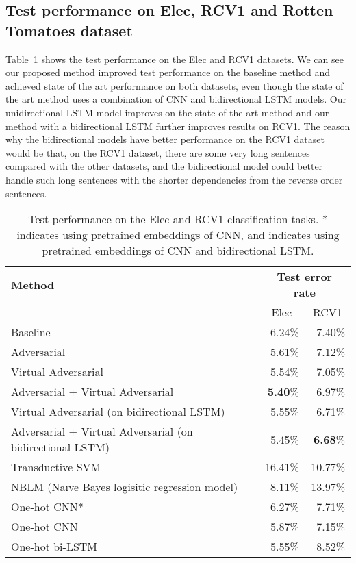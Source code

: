 \documentclass{article}
\begin{document}
\subsection{Test performance on Elec, RCV1 and Rotten Tomatoes dataset} 
Table~\ref{tab:elec_rcv1_error} shows the test performance on the Elec and RCV1
datasets.
We can see our proposed method improved test performance on the baseline method
and achieved state of the art performance on both datasets, even though the state
of the art method uses a combination of CNN and bidirectional LSTM models. Our
unidirectional LSTM model improves on the state of the art method and our method
with a bidirectional LSTM further improves results on RCV1. The reason why the bidirectional models have
better performance on the RCV1 dataset would be that, on the RCV1 dataset, there are some very long sentences compared with
the other datasets, and the bidirectional model could better handle such long sentences with the shorter dependencies from the reverse order sentences.

\begin{table}[ht]
		\caption{\label{tab:elec_rcv1_error}Test performance on the Elec and RCV1 classification tasks.
		* indicates using pretrained embeddings of CNN, and \textsuperscript{\textdagger} indicates using pretrained
		embeddings of CNN and bidirectional LSTM. }
                \centering
\begin{tabular}{lrr}
			\toprule
			\textbf{Method} & \multicolumn{2}{c}{\textbf{Test error rate}}\\
			\cmidrule{2-3}
			 & \multicolumn{1}{c}{Elec} & \multicolumn{1}{c}{RCV1} \\
			\midrule
			Baseline & 6.24\%  & 7.40\% \\
			Adversarial & 5.61\% & 7.12\%\\
			Virtual Adversarial & 5.54\% & 7.05\% \\
			Adversarial + Virtual Adversarial & \textbf{5.40}\% & 6.97\% \\
			\midrule
			Virtual Adversarial (on bidirectional LSTM) & 5.55\% & 6.71\% \\
			Adversarial + Virtual Adversarial (on bidirectional LSTM) & 5.45\% &\textbf{6.68}\% \\
			\midrule
                        Transductive SVM~\cite[]{johnson2015semi} & 16.41\% & 10.77\%\\
                        NBLM (Naıve Bayes logisitic regression model)  \cite[]{johnson2014effective} & 8.11\% & 13.97\% \\
			One-hot CNN* \cite[]{johnson2015semi} & 6.27\% & 7.71\% \\
			One-hot CNN\textsuperscript{\textdagger} \cite[]{johnson2016supervised} & 5.87\% & 7.15\% \\
			One-hot bi-LSTM\textsuperscript{\textdagger} \cite[]{johnson2016supervised} & 5.55\%  & 8.52\%\\
			\bottomrule
		\end{tabular}
\end{table}
\end{document}
